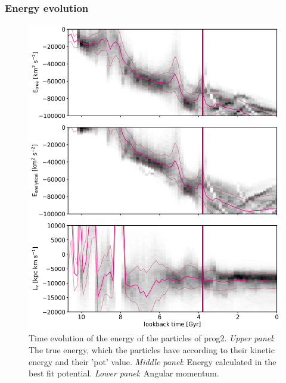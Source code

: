 \subsubsection{Energy evolution}\label{subsubsec:energy_evol}
\begin{figure}[htbp]
\captionsetup{format=plain}
    \centering
	\includegraphics[width=\textwidth]{plots/Dynamics/prog2/energy_time_evolution_hist_mean.png}
	\caption{Time evolution of the energy of the particles of prog2. \textit{Upper panel}: The true energy, which the particles have according to their kinetic energy and their 'pot' value. \textit{Middle panel}: Energy calculated in the best fit potential. \textit{Lower panel}: Angular momentum.}\label{fig:energy_time_evolution_prog2}
\end{figure}

